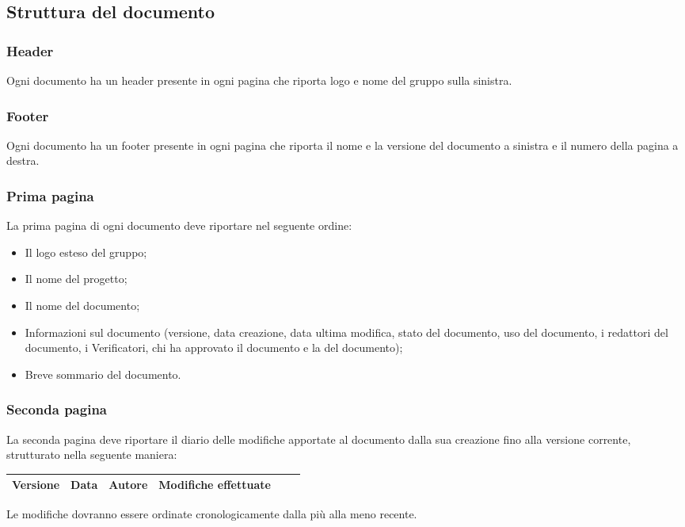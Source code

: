 \subsection{Struttura del documento}
\label{5.2}

\subsubsection{Header}
\label{5.2.1}
Ogni documento ha un header presente in ogni pagina che riporta logo e nome del gruppo sulla sinistra.

\subsubsection{Footer}
\label{5.2.2}
Ogni documento ha un footer presente in ogni pagina che riporta il nome e la versione del documento a sinistra e il numero della pagina a destra.

\subsubsection{Prima pagina}
\label{5.2.3}
La prima pagina di ogni documento deve riportare nel seguente ordine:
\begin{itemize}
\item Il logo esteso del gruppo;
\item Il nome del progetto;
\item Il nome del documento;
\item Informazioni sul documento (versione, data creazione, data ultima modifica, stato del documento, uso del documento, i redattori del documento, i Verificatori, chi ha approvato il documento e la  del documento);
\item Breve sommario del documento.
\end{itemize}

\subsubsection{Seconda pagina}
\label{5.2.4}
La seconda pagina deve riportare il diario delle modifiche apportate al documento dalla sua creazione fino alla versione corrente, strutturato nella seguente maniera:

\begin{center}
\begin{longtable}{|c|c|c|p{0.5\linewidth}|}
\toprule
\textbf{Versione} & \textbf{Data} & \textbf{Autore} & \textbf{Modifiche effettuate}\\

\bottomrule
\end{longtable}
\end{center}
Le modifiche dovranno essere ordinate cronologicamente dalla più alla meno recente.


